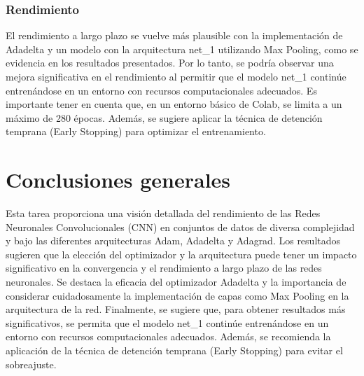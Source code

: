 \documentclass[journal]{IEEEtai}
\begin{document}
\subsubsection{\textbf{Rendimiento}}

El rendimiento a largo plazo se vuelve más plausible con la implementación de Adadelta y un modelo con la arquitectura net\_1 utilizando Max Pooling, como se evidencia en los resultados presentados. Por lo tanto, se podría observar una mejora significativa en el rendimiento al permitir que el modelo net\_1 continúe entrenándose en un entorno con recursos computacionales adecuados. Es importante tener en cuenta que, en un entorno básico de Colab, se limita a un máximo de 280 épocas. Además, se sugiere aplicar la técnica de detención temprana (Early Stopping) para optimizar el entrenamiento.


\section{Conclusiones generales}

Esta tarea proporciona una visión detallada del rendimiento de las Redes Neuronales Convolucionales (CNN) en conjuntos de datos de diversa complejidad y bajo las diferentes arquitecturas Adam, Adadelta y Adagrad. 
\hfill\break
Los resultados sugieren que la elección del optimizador y la arquitectura puede tener un impacto significativo en la convergencia y el rendimiento a largo plazo de las redes neuronales.
\hfill\break
Se destaca la eficacia del optimizador Adadelta y la importancia de considerar cuidadosamente la implementación de capas como Max Pooling en la arquitectura de la red. 
\hfill\break
Finalmente, se sugiere que, para obtener resultados más significativos, se permita que el modelo net\_1 continúe entrenándose en un entorno con recursos computacionales adecuados. Además, se recomienda la aplicación de la técnica de detención temprana (Early Stopping) para evitar el sobreajuste.
\end{document}
